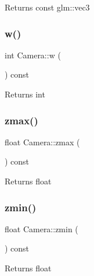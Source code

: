 \begin{DoxyReturn}{Returns}
const glm\+::vec3 
\end{DoxyReturn}
\mbox{\label{class_camera_a8695ceeb4597517ca9f2e09284f2506f}} 
\subsubsection{\texorpdfstring{w()}{w()}}
{\footnotesize\ttfamily int Camera\+::w (\begin{DoxyParamCaption}{ }\end{DoxyParamCaption}) const\hspace{0.3cm}{\ttfamily [inline]}}

\begin{DoxyReturn}{Returns}
int 
\end{DoxyReturn}
\mbox{\label{class_camera_a9f4ee36190bc2ef829efe11a8947dd5e}} 
\subsubsection{\texorpdfstring{zmax()}{zmax()}}
{\footnotesize\ttfamily float Camera\+::zmax (\begin{DoxyParamCaption}{ }\end{DoxyParamCaption}) const\hspace{0.3cm}{\ttfamily [inline]}}

\begin{DoxyReturn}{Returns}
float 
\end{DoxyReturn}
\mbox{\label{class_camera_adf4779e2bc0dac7b719f4350c0db07f3}} 
\subsubsection{\texorpdfstring{zmin()}{zmin()}}
{\footnotesize\ttfamily float Camera\+::zmin (\begin{DoxyParamCaption}{ }\end{DoxyParamCaption}) const\hspace{0.3cm}{\ttfamily [inline]}}

\begin{DoxyReturn}{Returns}
float 
\end{DoxyReturn}


